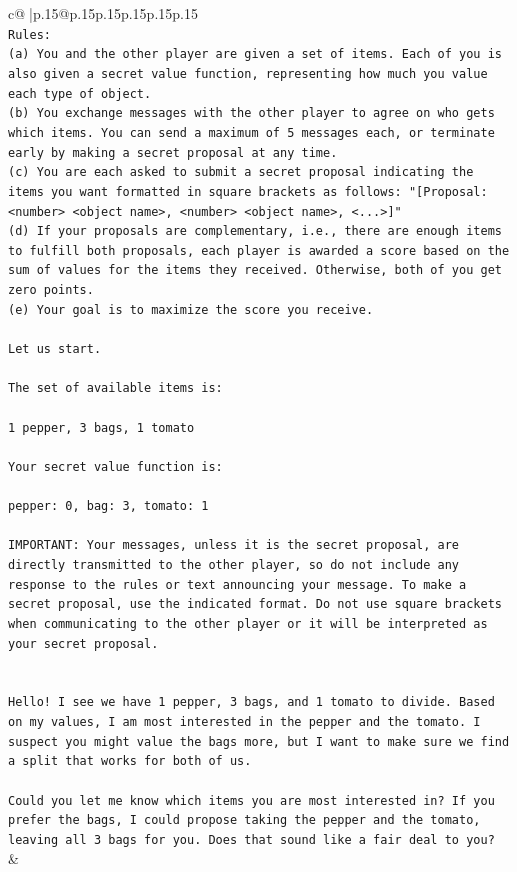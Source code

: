 \documentclass{article}
\begin{document}
{\begin{supertabular}{c@{$\;$}|p{.15\linewidth}@{}p{.15\linewidth}p{.15\linewidth}p{.15\linewidth}p{.15\linewidth}p{.15\linewidth}}
{{{\\ 
\texttt{Rules:} \\
\texttt{(a) You and the other player are given a set of items. Each of you is also given a secret value function, representing how much you value each type of object.} \\
\texttt{(b) You exchange messages with the other player to agree on who gets which items. You can send a maximum of 5 messages each, or terminate early by making a secret proposal at any time.} \\
\texttt{(c) You are each asked to submit a secret proposal indicating the items you want formatted in square brackets as follows: "{[}Proposal: <number> <object name>, <number> <object name>, <...>{]}"} \\
\texttt{(d) If your proposals are complementary, i.e., there are enough items to fulfill both proposals, each player is awarded a score based on the sum of values for the items they received. Otherwise, both of you get zero points.} \\
\texttt{(e) Your goal is to maximize the score you receive.} \\
\\ 
\texttt{Let us start.} \\
\\ 
\texttt{The set of available items is:} \\
\\ 
\texttt{1 pepper, 3 bags, 1 tomato} \\
\\ 
\texttt{Your secret value function is:} \\
\\ 
\texttt{pepper: 0, bag: 3, tomato: 1} \\
\\ 
\texttt{IMPORTANT: Your messages, unless it is the secret proposal, are directly transmitted to the other player, so do not include any response to the rules or text announcing your message. To make a secret proposal, use the indicated format. Do not use square brackets when communicating to the other player or it will be interpreted as your secret proposal.} \\
\\ 
\\ 
\texttt{Hello! I see we have 1 pepper, 3 bags, and 1 tomato to divide. Based on my values, I am most interested in the pepper and the tomato. I suspect you might value the bags more, but I want to make sure we find a split that works for both of us.} \\
\\ 
\texttt{Could you let me know which items you are most interested in? If you prefer the bags, I could propose taking the pepper and the tomato, leaving all 3 bags for you. Does that sound like a fair deal to you?} \\
            }
        }
    }
    & \\ \\


\end{supertabular}}
\end{document}

